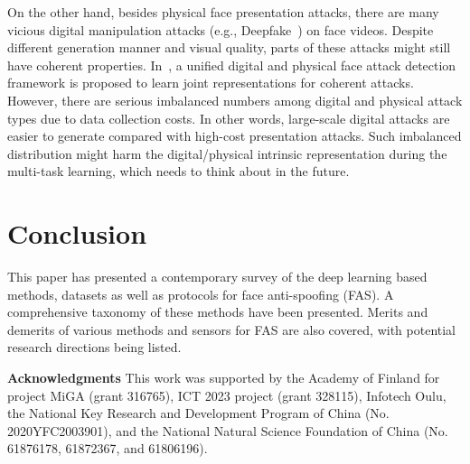\documentclass[10pt,journal,compsoc]{IEEEtran}
\begin{document}
On the other hand, besides physical face presentation attacks, there are many vicious digital manipulation attacks (e.g., Deepfake~\cite{ciftci2020fakecatcher}) on face videos. Despite different generation manner and visual quality, parts of these attacks might still have coherent properties. In~\cite{deb2021unified}, a unified digital and physical face attack detection framework is proposed to learn joint representations for coherent attacks. However, there are serious imbalanced numbers among digital and physical attack types due to data collection costs. In other words, large-scale digital attacks are easier to generate compared with high-cost presentation attacks. Such imbalanced distribution might harm the digital/physical intrinsic representation during the multi-task learning, which needs to think about in the future. 








\section{Conclusion} \label{sec:conclusion}
This paper has presented a contemporary survey of the deep learning based methods, datasets as well as protocols for face anti-spoofing (FAS). A comprehensive taxonomy of these methods have been presented. Merits and demerits of various methods and sensors for FAS are also covered, with potential research directions being listed.

\vspace{0.5em}

\noindent\textbf{Acknowledgments} \quad This work was supported by the Academy of Finland for project MiGA (grant 316765), ICT 2023 project (grant 328115), Infotech Oulu, the National Key Research and Development Program of China (No. 2020YFC2003901), and the National Natural Science Foundation of China (No. 61876178, 61872367,
and 61806196).
\end{document}
